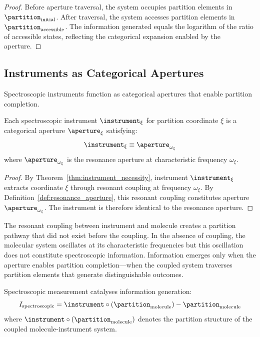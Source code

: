 \begin{proof}
Before aperture traversal, the system occupies partition elements in $\partition_{\mathrm{initial}}$. After traversal, the system accesses partition elements in $\partition_{\mathrm{accessible}}$. The information generated equals the logarithm of the ratio of accessible states, reflecting the categorical expansion enabled by the aperture.
\end{proof}

\subsection{Instruments as Categorical Apertures}

Spectroscopic instruments function as categorical apertures that enable partition completion.

\begin{theorem}
\label{thm:instrument_aperture}
Each spectroscopic instrument $\instrument_\xi$ for partition coordinate $\xi$ is a categorical aperture $\aperture_\xi$ satisfying:
\begin{equation}
\instrument_\xi \equiv \aperture_{\omega_\xi}
\end{equation}
where $\aperture_{\omega_\xi}$ is the resonance aperture at characteristic frequency $\omega_\xi$.
\end{theorem}

\begin{proof}
By Theorem~\ref{thm:instrument_necessity}, instrument $\instrument_\xi$ extracts coordinate $\xi$ through resonant coupling at frequency $\omega_\xi$. By Definition~\ref{def:resonance_aperture}, this resonant coupling constitutes aperture $\aperture_{\omega_\xi}$. The instrument is therefore identical to the resonance aperture.
\end{proof}

The resonant coupling between instrument and molecule creates a partition pathway that did not exist before the coupling. In the absence of coupling, the molecular system oscillates at its characteristic frequencies but this oscillation does not constitute spectroscopic information. Information emerges only when the aperture enables partition completion—when the coupled system traverses partition elements that generate distinguishable outcomes.

\begin{theorem}
\label{thm:spec_catalysis}
Spectroscopic measurement catalyses information generation:
\begin{equation}
I_{\mathrm{spectroscopic}} = \instrument \circ (\partition_{\mathrm{molecule}}) - \partition_{\mathrm{molecule}}
\end{equation}
where $\instrument \circ (\partition_{\mathrm{molecule}})$ denotes the partition structure of the coupled molecule-instrument system.
\end{theorem}

